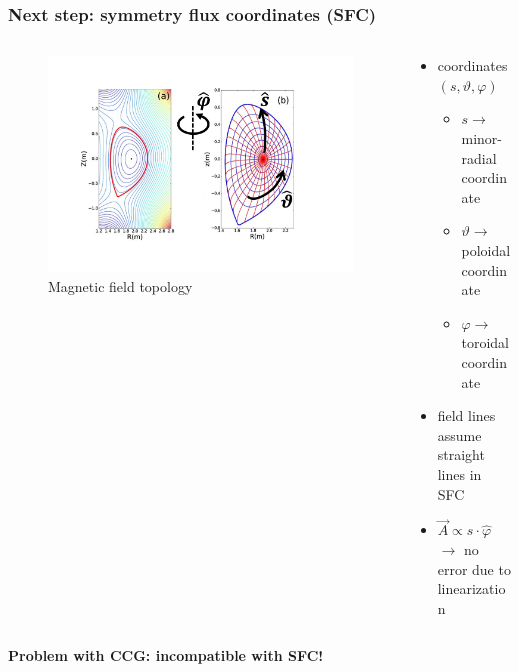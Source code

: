 \documentclass{beamer}
\begin{document}
\begin{frame}[noframenumbering]
\frametitle{Next step: symmetry flux coordinates (SFC)}
\vspace{-1 cm}
\begin{columns}[onlytextwidth]
	\begin{column}{0.5\textwidth}
		\begin{center}
			\begin{figure}
				\includegraphics[trim={2cm 3cm 5cm 2cm},clip,width=1\textwidth]{FIGURES/SFC_pdf1.pdf}
				\caption{Magnetic field topology}
			\end{figure}
		\end{center}
	\end{column}
	\begin{column}{0.5\textwidth}
		\vspace{0 cm}
		\begin{center}
			\begin{itemize}
				\item coordinates $(s,\vartheta,\varphi)$\\
				\begin{itemize}
					\item $s\rightarrow$ minor-radial coordinate
					\item $\vartheta \rightarrow$ poloidal coordinate
					\item $\varphi \rightarrow$ toroidal coordinate
				\end{itemize}
				\item field lines assume straight lines in SFC
				\item $\vec{A}\propto s\cdot\hat{\varphi}$
				$\rightarrow$ no error due to linearization
			\end{itemize}
		\end{center}
	\end{column}
\end{columns}
\vspace{0.4 cm}
\textbf{Problem with CCG: incompatible with SFC!}
\end{frame}
\end{document}

